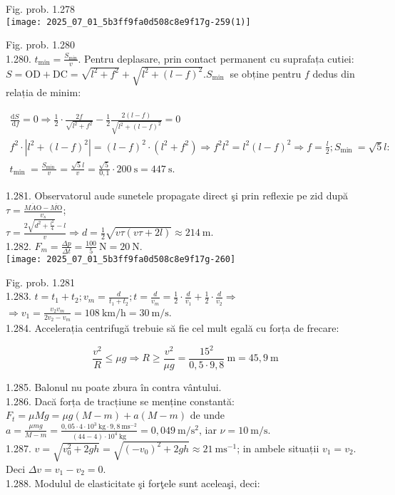Fig. prob. 1.278\\
\texttt{[image: 2025\_07\_01\_5b3ff9fa0d508c8e9f17g-259(1)]}

Fig. prob. 1.280\\
1.280. $t_{\min }=\frac{S_{\min }}{v}$. Pentru deplasare, prin contact permanent cu suprafața cutiei: $S=\mathrm{OD}+\mathrm{DC}=\sqrt{l^{2}+f^{2}}+\sqrt{l^{2}+(l-f)^{2}} . S_{\text {min }}$ se obține pentru $f$ dedus din relația de minim:

$$
\begin{gathered}
\frac{\mathrm{d} S}{\mathrm{~d} f}=0 \Rightarrow \frac{1}{2} \cdot \frac{2 f}{\sqrt{l^{2}+f^{2}}}-\frac{1}{2} \frac{2(l-f)}{\sqrt{l^{2}+(l-f)^{2}}}=0 \\
f^{2} \cdot\left|l^{2}+(l-f)^{2}\right|=(l-f)^{2} \cdot\left(l^{2}+f^{2}\right) \Rightarrow f^{2} l^{2}=l^{2}(l-f)^{2} \Rightarrow f=\frac{l}{2} ; S_{\text {min }}=\sqrt{5} l: \\
t_{\text {min }}=\frac{S_{\text {min }}}{v}=\frac{\sqrt{5} l}{v}=\frac{\sqrt{5}}{0,1} \cdot 200 \mathrm{~s}=447 \mathrm{~s} .
\end{gathered}
$$

1.281. Observatorul aude sunetele propagate direct şi prin reflexie pe zid după $\tau=\frac{\overline{M A \mathrm{O}}-\overline{M \mathrm{O}}}{v_{s}}$;\\
$\tau=\frac{2 \sqrt{d^{2}+\frac{l^{2}}{4}}-l}{v} \Rightarrow d=\frac{1}{2} \sqrt{v \tau(v \tau+2 l)} \approx 214 \mathrm{~m}$.\\
1.282. $F_{m}=\frac{\Delta p}{\Delta t}=\frac{100}{5} \mathrm{~N}=20 \mathrm{~N}$.\\
\texttt{[image: 2025\_07\_01\_5b3ff9fa0d508c8e9f17g-260]}

Fig. prob. 1.281\\
1.283. $t=t_{1}+t_{2} ; v_{m}=\frac{d}{t_{1}+t_{2}} ; t=\frac{d}{v_{m}}=\frac{1}{2} \cdot \frac{d}{v_{1}}+\frac{1}{2} \cdot \frac{d}{v_{2}} \Rightarrow$ $\Rightarrow v_{1}=\frac{v_{2} v_{m}}{2 v_{2}-v_{m}}=108 \mathrm{~km} / \mathrm{h}=30 \mathrm{~m} / \mathrm{s}$.\\
1.284. Accelerația centrifugă trebuie să fie cel mult egală cu forța de frecare:

$$
\frac{v^{2}}{R} \leq \mu g \Rightarrow R \geq \frac{v^{2}}{\mu g}=\frac{15^{2}}{0,5 \cdot 9,8} \mathrm{~m}=45,9 \mathrm{~m}
$$

1.285. Balonul nu poate zbura în contra vântului.\\
1.286. Dacă forța de tracțiune se menține constantă:\\
$F_{t}=\mu M g=\mu g(M-m)+a(M-m)$ de unde\\
$a=\frac{\mu m g}{M-m}=\frac{0,05 \cdot 4 \cdot 10^{3} \mathrm{~kg} \cdot 9,8 \mathrm{~ms}^{-2}}{(44-4) \cdot 10^{4} \mathrm{~kg}}=0,049 \mathrm{~m} / \mathrm{s}^{2}$, iar $\nu=10 \mathrm{~m} / \mathrm{s}$.\\
1.287. $v=\sqrt{v_{0}^{2}+2 g h}=\sqrt{\left(-v_{0}\right)^{2}+2 g h} \approx 21 \mathrm{~ms}^{-1}$; in ambele situații $v_{1}=v_{2}$. Deci $\Delta v=v_{1}-v_{2}=0$.\\
1.288. Modulul de elasticitate şi forţele sunt aceleaşi, deci:

